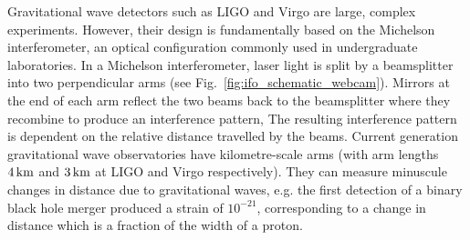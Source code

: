 \documentclass[paper-main.tex]{subfiles}
\begin{document}
Gravitational wave detectors such as LIGO and Virgo are large, complex experiments. 
However, their design is fundamentally based on the Michelson interferometer, an optical configuration commonly used in undergraduate laboratories. 
In a Michelson interferometer, laser light is split by a beamsplitter into two perpendicular arms (see Fig.~\ref{fig:ifo_schematic_webcam}). 
Mirrors at the end of each arm reflect the two beams back to the beamsplitter where they recombine to produce an interference pattern, 
The resulting interference pattern is dependent on the relative distance travelled by the beams. 
Current generation gravitational wave observatories have kilometre-scale arms (with arm lengths $4\,{\rm km}$ and $3\,{\rm km}$ at LIGO and Virgo respectively). 
They can measure minuscule changes in distance due to gravitational waves, e.g. the first detection of a binary black hole merger produced a strain of $10^{-21}$, corresponding to a change in distance which is a fraction of the width of a proton. 

\end{document}
